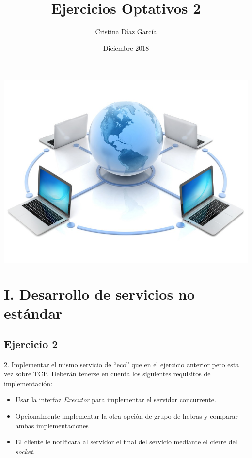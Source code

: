 \documentclass{article}
\title{Ejercicios Optativos 2}
\author{Cristina Díaz García}
\date{Diciembre 2018}
\begin{document}

\begin{titlingpage}
\maketitle

\begin{center}
\includegraphics[scale=0.4]{images/comunicaciones.png} 
\end{center}

\end{titlingpage}

\newpage

\tableofcontents

\newpage

\section{I. Desarrollo de servicios no estándar}


\subsection{Ejercicio 2}

2. Implementar el mismo servicio de “eco” que en el ejercicio anterior pero esta vez sobre
TCP. Deberán tenerse en cuenta los siguientes requisitos de implementación:
\begin{itemize}
\item Usar la interfaz \textit{Executor} para implementar el servidor concurrente.
\item Opcionalmente implementar la otra opción de grupo de hebras y comparar ambas
implementaciones
\item El cliente le notificará al servidor el final del servicio mediante el cierre del \textit{socket}.
\end{itemize}
\end{document}
